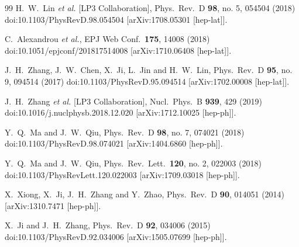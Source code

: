 \documentclass[aps,prd,preprint,tightenlines,superscriptaddress,nofootinbib]{revtex4}
\begin{document}
\begin{thebibliography}{99}
  H.~W.~Lin {\it et al.} [LP3 Collaboration],
  Phys.\ Rev.\ D {\bf 98}, no. 5, 054504 (2018)
  doi:10.1103/PhysRevD.98.054504
  [arXiv:1708.05301 [hep-lat]].

  C.~Alexandrou {\it et al.},
  EPJ Web Conf.\  {\bf 175}, 14008 (2018)
  doi:10.1051/epjconf/201817514008
  [arXiv:1710.06408 [hep-lat]].

  J.~H.~Zhang, J.~W.~Chen, X.~Ji, L.~Jin and H.~W.~Lin,
  Phys.\ Rev.\ D {\bf 95}, no. 9, 094514 (2017)
  doi:10.1103/PhysRevD.95.094514
  [arXiv:1702.00008 [hep-lat]].

  J.~H.~Zhang {\it et al.} [LP3 Collaboration],
  Nucl.\ Phys.\ B {\bf 939}, 429 (2019)
  doi:10.1016/j.nuclphysb.2018.12.020
  [arXiv:1712.10025 [hep-ph]].

  Y.~Q.~Ma and J.~W.~Qiu,
  Phys.\ Rev.\ D {\bf 98}, no. 7, 074021 (2018)
  doi:10.1103/PhysRevD.98.074021
  [arXiv:1404.6860 [hep-ph]].

  Y.~Q.~Ma and J.~W.~Qiu,
  Phys.\ Rev.\ Lett.\  {\bf 120}, no. 2, 022003 (2018)
  doi:10.1103/PhysRevLett.120.022003
  [arXiv:1709.03018 [hep-ph]].


  X.~Xiong, X.~Ji, J.~H.~Zhang and Y.~Zhao,
  Phys.\ Rev.\ D {\bf 90}, 014051 (2014)
  [arXiv:1310.7471 [hep-ph]].
 


  
  X.~Ji and J.~H.~Zhang,
  Phys.\ Rev.\ D {\bf 92}, 034006 (2015)
  doi:10.1103/PhysRevD.92.034006
  [arXiv:1505.07699 [hep-ph]].


\end{thebibliography}
\end{document}
